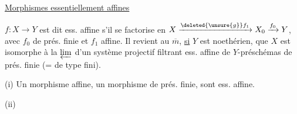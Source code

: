 \uline{Morphismes essentiellement affines}

$f:X\longrightarrow Y$ est dit ess. affine s'il se factorise en $X\xrightarrow{\deleted{\unsure{g}}f_1}X_0\xrightarrow{f_0}Y$, avec $f_0$ de prés. finie et $f_1$ affine. Il revient au $\overline m$, \uline{si} $Y$ est  noethérien, que $X$ est isomorphe à la $\varprojlim$ d'un système projectif filtrant  ess. affine de $Y$-préschémas de prés. finie (= de type fini).

(i) Un morphisme affine, un morphisme de prés. finie, sont ess. affine.

(ii)
